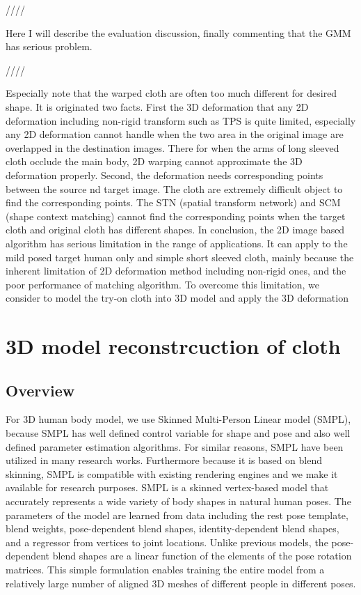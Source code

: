 \documentclass[runningheads]{llncs}
\begin{document}
////

Here I will describe the evaluation discussion, finally commenting that the GMM has serious problem.

////

Especially note that the warped cloth are often too much different for desired shape. It is originated two facts. First the 3D deformation that any 2D deformation including non-rigid transform such as TPS is quite limited, especially any 2D deformation cannot handle when the two area in the original image are overlapped in the destination images. There for when the arms of long sleeved cloth occlude the main body, 2D warping cannot approximate the 3D deformation properly. Second, the deformation needs corresponding points  between the source nd target image. The cloth are extremely difficult object to find the corresponding points. The STN (spatial transform network) and SCM (shape context matching) cannot find the corresponding points when the target cloth and original cloth has different shapes. In conclusion, the 2D image based algorithm has serious limitation in the range of applications. It can apply to the mild posed target human only and simple short sleeved cloth, mainly because the inherent limitation of 2D deformation method including non-rigid ones, and the poor performance of matching algorithm.  To overcome this limitation, we consider to model the try-on cloth into 3D model and apply the 3D deformation


\section{3D model reconstrcuction of cloth} 

\subsection{Overview} 

For 3D human body model, we use Skinned Multi-Person Linear model (SMPL), because SMPL has well defined control variable for shape and pose and also well defined parameter estimation  algorithms. For similar reasons, SMPL have been utilized in many research works. Furthermore because it is based on blend skinning, SMPL is compatible with existing rendering engines and we make it available for research purposes. SMPL is a skinned vertex-based model that accurately represents a wide variety of body shapes in natural human poses. The parameters of the model are learned from data including the rest pose template, blend weights, pose-dependent blend shapes, identity-dependent blend shapes, and a regressor from vertices to joint locations. Unlike previous models, the pose-dependent blend shapes are a linear function of the elements of the pose rotation matrices. This simple formulation enables training the entire model from a relatively large number of aligned 3D meshes of different people in different poses. 
\end{document}
